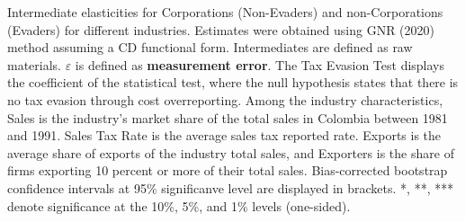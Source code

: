 \documentclass[
  12pt]{article}
\theoremstyle{definition}
\theoremstyle{remark}
\begin{document}
\begin{table}

\caption{\label{tbl-ielas-most-least-likely}Intermediate elasticities
for Corporations (Non-Evaders) and non-Corporations (Evaders) for
different industries. Estimates were obtained using GNR (2020) method
assuming a CD functional form. Intermediates are defined as raw
materials. \(\varepsilon\) is defined as \textbf{measurement error}. The
Tax Evasion Test displays the coefficient of the statistical test, where
the null hypothesis states that there is no tax evasion through cost
overreporting. Among the industry characteristics, Sales is the
industry's market share of the total sales in Colombia between 1981 and
1991. Sales Tax Rate is the average sales tax reported rate. Exports is
the average share of exports of the industry total sales, and Exporters
is the share of firms exporting 10 percent or more of their total sales.
Bias-corrected bootstrap confidence intervals at 95\% significanve level
are displayed in brackets. *, **, *** denote significance at the 10\%,
5\%, and 1\% levels (one-sided).}

\centering{

}
\end{table}
\end{document}
